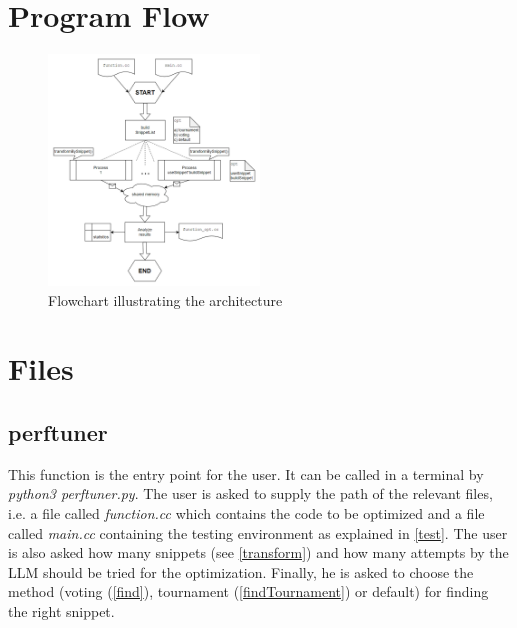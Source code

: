 \documentclass[twocolumn]{article}
\begin{document}
\section{Program Flow} \label{flow}
\begin{figure}[h]
    \centering
    \includegraphics[width=0.5\textwidth]{images/architecture.png} 
    \caption{Flowchart illustrating the architecture}
    \label{fig:bild1}
\end{figure}

\section{Files} \label{files}
\subsection{perftuner}
This function is the entry point for the user. It can be called in a terminal by \textit{python3 perftuner.py}. The user is asked to supply the path of the relevant files, i.e. a file called \textit{function.cc} which contains the code to be optimized and a file called \textit{main.cc} containing the testing environment as explained in \ref{test}. The user is also asked how many snippets (see \ref{transform}) and how many attempts by the LLM should be tried for the optimization. Finally, he is asked to choose the method (voting (\ref{find}), tournament (\ref{findTournament}) or default) for finding the right snippet.
\end{document}
